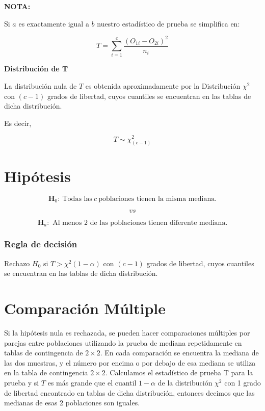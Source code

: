 \documentclass[
  a4paper,
  oneside,
  openany]{book}
\begin{document}
\textbf{NOTA:}

Si \(a\) es exactamente igual a \(b\) nuestro estadístico de prueba se simplifica en:

\[T=\sum^{c}_{i=1}\frac{(O_{1i}-O_{2i})^2}{n_i}\]

\textbf{Distribución de T}

La distribución nula de \(T\) es obtenida aproximadamente por la Distribución \(\chi^2\) con \((c-1)\) grados de libertad, cuyos cuantiles se encuentran en las tablas de dicha distribución.

Es decir,

\[T\sim \chi^2_{(c-1)}\]

\hypertarget{hipuxf3tesis-12}{%
\section{Hipótesis}\label{hipuxf3tesis-12}}

\[\textbf{H}_0: \ \mbox{Todas las} \  c \  \mbox{poblaciones tienen la misma mediana.}\]

\[vs\]

\[\textbf{H}_a:\mbox{ Al menos 2 de las poblaciones tienen diferente mediana.}\]

\hypertarget{regla-de-decisiuxf3n-26}{%
\subsubsection*{Regla de decisión}\label{regla-de-decisiuxf3n-26}}


Rechazo \(H_0\) si \(T> \chi^2(1-\alpha)\) con \((c-1)\) grados de libertad, cuyos cuantiles se encuentran en las tablas de dicha distribución.

\hypertarget{comparaciuxf3n-muxfaltiple-1}{%
\section{Comparación Múltiple}\label{comparaciuxf3n-muxfaltiple-1}}

Si la hipótesis nula es rechazada, se pueden hacer comparaciones múltiples por parejas entre poblaciones utilizando la prueba de mediana repetidamente en tablas de contingencia de \(2 \times 2\). En cada comparación se encuentra la mediana de las dos muestras, y el número por encima o por debajo de esa mediana se utiliza en la tabla de contingencia \(2 \times 2\). Calculamos el estadístico de prueba T para la prueba y si \(T\) es más grande que el cuantil \(1-\alpha\) de la distribución \(\chi^2\) con 1 grado de libertad encontrado en tablas de dicha distribución, entonces decimos que las medianas de esas 2 poblaciones son iguales.
\end{document}
